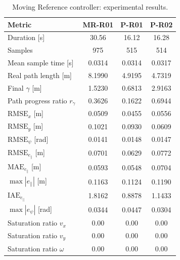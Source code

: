 \begin{table}[H]
  \centering
  \caption{Moving Reference controller: experimental results.}
  \label{tab:mref_experimental_results}
  \scriptsize
  \setlength{\tabcolsep}{6pt}
  \renewcommand{\arraystretch}{0.98}
  \begin{tabular}{lccc}
  \toprule
  \textbf{Metric} &
  \textbf{MR-R01} &
  \textbf{P-R01} &
  \textbf{P-R02} \\
  \midrule
  Duration [s] & 30.56 & 16.12 & 16.28 \\
  Samples & 975 & 515 & 514 \\
  Mean sample time [s] & 0.0314 & 0.0314 & 0.0317 \\
  Real path length [m] & 8.1990 & 4.9195 & 4.7319 \\
  Final \(\gamma\) [m] & 1.5230 & 0.6813 & 2.9163 \\
  Path progress ratio \(r_{\gamma}\) & 0.3626 & 0.1622 & 0.6944 \\
  \(\mathrm{RMSE}_x\) [m] & 0.0509 & 0.0455 & 0.0556 \\
  \(\mathrm{RMSE}_y\) [m] & 0.1021 & 0.0930 & 0.0609 \\
  \(\mathrm{RMSE}_{\psi}\) [rad] & 0.0141 & 0.0148 & 0.0147 \\
  \(\mathrm{RMSE}_{e_{\parallel}}\) [m] & 0.0701 & 0.0629 & 0.0772 \\
  \(\mathrm{MAE}_{e_{\parallel}}\) [m] & 0.0593 & 0.0548 & 0.0704 \\
  \(\max |e_{\parallel}|\) [m] & 0.1163 & 0.1124 & 0.1190 \\
  \(\mathrm{IAE}_{e_{\parallel}}\) & 1.8162 & 0.8878 & 1.1433 \\
  \(\max |e_{\psi}|\) [rad] & 0.0344 & 0.0447 & 0.0304 \\
  Saturation ratio \(v_x\) & 0.00 & 0.00 & 0.00 \\
  Saturation ratio \(v_y\) & 0.00 & 0.00 & 0.00 \\
  Saturation ratio \(\omega\) & 0.00 & 0.00 & 0.00 \\
  \bottomrule
  \end{tabular}
\end{table}

